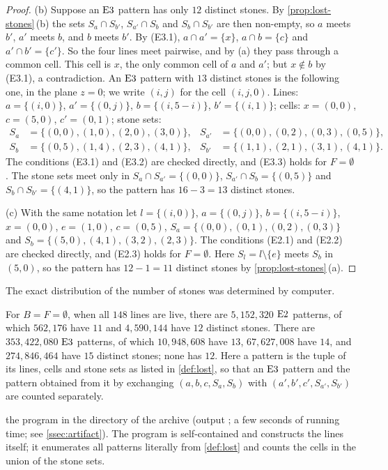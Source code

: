 \begin{proof}
(b) Suppose an $\mathrm{E3}$ pattern has only $12$ distinct stones. By \cref{prop:lost-stones}\,(b) the
sets $S_a\cap S_{b'}$, $S_{a'}\cap S_b$ and $S_b\cap S_{b'}$ are then non-empty, so $a$ meets $b'$, $a'$ meets
$b$, and $b$ meets $b'$. By (E3.1), $a\cap a'=\{x\}$, $a\cap b=\{c\}$ and $a'\cap b'=\{c'\}$. So the four lines
meet pairwise, and by (a) they pass through a common cell. This cell is $x$, the only common cell of $a$ and
$a'$; but $x\notin b$ by (E3.1), a contradiction. An $\mathrm{E3}$ pattern with $13$ distinct stones is the
following one, in the plane $z=0$; we write $(i,j)$ for the cell $(i,j,0)$. Lines:
$a=\{(i,0)\}$, $a'=\{(0,j)\}$, $b=\{(i,5-i)\}$, $b'=\{(i,1)\}$; cells: $x=(0,0)$, $c=(5,0)$, $c'=(0,1)$;
stone sets:
\begin{align*}
S_a&=\{(0,0),(1,0),(2,0),(3,0)\}, & S_{a'}&=\{(0,0),(0,2),(0,3),(0,5)\},\\
S_b&=\{(0,5),(1,4),(2,3),(4,1)\}, & S_{b'}&=\{(1,1),(2,1),(3,1),(4,1)\}.
\end{align*}
The conditions (E3.1) and (E3.2) are checked directly, and (E3.3) holds for $F=\emptyset$. The stone sets
meet only in $S_a\cap S_{a'}=\{(0,0)\}$, $S_{a'}\cap S_b=\{(0,5)\}$ and $S_b\cap S_{b'}=\{(4,1)\}$, so the
pattern has $16-3=13$ distinct stones.

(c) With the same notation let $l=\{(i,0)\}$, $a=\{(0,j)\}$, $b=\{(i,5-i)\}$, $x=(0,0)$, $e=(1,0)$,
$c=(0,5)$, $S_a=\{(0,0),(0,1),(0,2),(0,3)\}$ and $S_b=\{(5,0),(4,1),(3,2),(2,3)\}$. The conditions (E2.1)
and (E2.2) are checked directly, and (E2.3) holds for $F=\emptyset$. Here
$S_l=l\setminus\{e\}$ meets $S_b$ in $(5,0)$, so the pattern has $12-1=11$ distinct stones by
\cref{prop:lost-stones}\,(a).
\end{proof}

The exact distribution of the number of stones was determined by computer.

\begin{fact}\label{fact:e23}
For $B=F=\emptyset$, when all $148$ lines are live, there are $5{,}152{,}320$ $\mathrm{E2}$ patterns, of which
$562{,}176$ have $11$ and $4{,}590{,}144$ have $12$ distinct stones. There are $353{,}422{,}080$ $\mathrm{E3}$
patterns, of which $10{,}948{,}608$ have $13$, $67{,}627{,}008$ have $14$, and $274{,}846{,}464$ have $15$ distinct
stones; none has $12$. Here a pattern is the tuple of its lines, cells and stone sets as listed in
\cref{def:lost}, so that an $\mathrm{E3}$ pattern and the pattern obtained from it by exchanging
$(a,b,c,S_a,S_b)$ with $(a',b',c',S_{a'},S_{b'})$ are counted separately.

\established the program  in the directory  of the
archive (output ; a few seconds of running time; see \cref{ssec:artifact}). The program is self-contained and constructs the
lines itself; it enumerates all patterns literally from \cref{def:lost} and counts the cells in the
union of the stone sets.
\end{fact}

